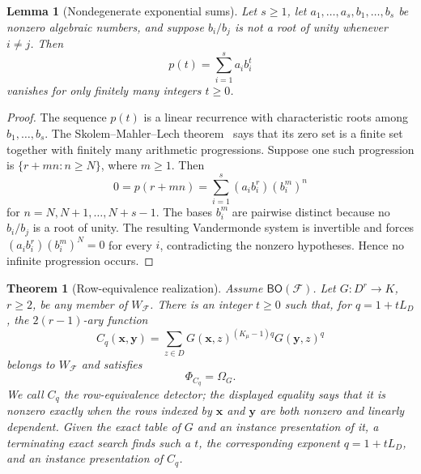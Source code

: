 \documentclass[11pt]{article}
\theoremstyle{plain}
\newtheorem{theorem}{Theorem}[section]
\newtheorem{lemma}[lemma]{Lemma}
\theoremstyle{definition}
\theoremstyle{remark}
\newcommand{\cF}{\mathcal F}
\newcommand{\BO}{\mathsf{BO}}
\newcommand{\SuppRel}[1]{\Phi_{#1}}
\newcommand{\RowEq}[1]{\Omega_{#1}}
\begin{document}
\begin{lemma}[Nondegenerate exponential sums]
\label{lem:nondegenerate-exponential-sums}
Let $s\ge1$, let $a_1,\ldots,a_s,b_1,\ldots,b_s$ be nonzero algebraic
numbers, and
suppose $b_i/b_j$ is not a root of unity whenever $i\ne j$.  Then
\[
  p(t)=\sum_{i=1}^s a_ib_i^t
\]
vanishes for only finitely many integers $t\ge0$.
\end{lemma}

\begin{proof}
The sequence $p(t)$ is a linear recurrence with characteristic roots among
$b_1,\ldots,b_s$.  The Skolem--Mahler--Lech theorem~\cite{Lech1953} says that
its zero set is a finite set together with finitely many arithmetic
progressions.  Suppose one such progression is
$\{r+mn:n\ge N\}$, where $m\ge1$.  Then
\[
  0=p(r+mn)=\sum_{i=1}^s(a_i b_i^r)(b_i^m)^n
\]
for $n=N,N+1,\ldots,N+s-1$.  The bases $b_i^m$ are pairwise distinct because
no $b_i/b_j$ is a root of unity.  The resulting Vandermonde system is
invertible and forces
$(a_i b_i^r)(b_i^m)^N=0$ for every $i$, contradicting the nonzero hypotheses.
Hence no infinite progression occurs.
\end{proof}

\begin{theorem}[Row-equivalence realization]
\label{thm:omega-support-realization}
Assume $\BO(\cF)$.  Let $G:D^r\to K$, $r\ge2$, be any member of
$W_{\cF}$.  There is an integer $t\ge0$ such that, for $q=1+tL_D$, the
$2(r-1)$-ary function
\begin{equation}
  C_q(\mathbf x,\mathbf y)
  =\sum_{z\in D}
       G(\mathbf x,z)^{(K_\mu-1)q}G(\mathbf y,z)^q
  \label{eq:omega-detector}
\end{equation}
belongs to $W_{\cF}$ and satisfies
\begin{equation}
  \SuppRel{C_q}=\RowEq G.
  \label{eq:omega-is-support}
\end{equation}
We call $C_q$ the \emph{row-equivalence detector}; the displayed equality
says that it is nonzero exactly when the rows indexed by $\mathbf x$ and
$\mathbf y$ are both nonzero and linearly dependent.
Given the exact table of $G$ and an instance presentation of it, a terminating
exact search finds such a $t$, the corresponding exponent $q=1+tL_D$, and an
instance presentation of $C_q$.
\end{theorem}
\end{document}
